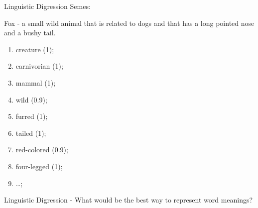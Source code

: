 \documentclass{beamer}
\begin{document}
    \begin{frame}{Linguistic Digression}
      Semes:

      \begin{minipage}[t]{0.25\linewidth}
      \end{minipage}%
      \begin{minipage}[t]{0.70\linewidth}%
        Fox - a small wild animal that is related to dogs and that has a long
        pointed nose and a bushy tail.
      \end{minipage}
      \vfill
      \begin{minipage}[t]{0.45\linewidth}\scriptsize
        \begin{enumerate}
        \item creature (1);
        \item carnivorian (1);
        \item mammal (1);
        \item wild (0.9);
        \item furred (1);
        \item tailed (1);
        \item red-colored (0.9);
        \item four-legged (1);
        \item \dots;%
        \end{enumerate}%
      \end{minipage}\hfill%
      \begin{minipage}[t]{0.45\linewidth}%
      \end{minipage}
    \end{frame}

    \begin{frame}{Linguistic Digression}
      - What would be the best way to represent word meanings?

    \end{frame}
\end{document}
